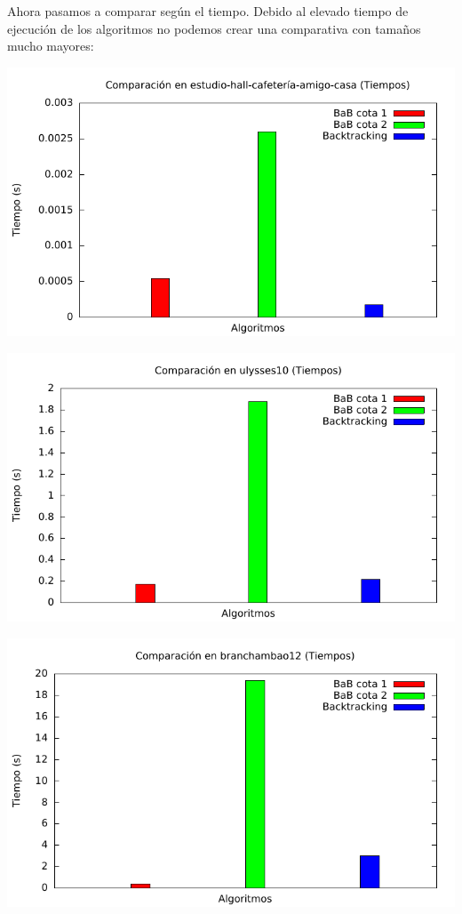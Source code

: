 Ahora pasamos a comparar según el tiempo. Debido al elevado tiempo de ejecución de los algoritmos no podemos crear una comparativa con tamaños mucho mayores:

\includegraphics[width=15cm]{img/barras_e-h-c-a-c5_t}

\includegraphics[width=15cm]{img/barras_ulysses10_t}

\includegraphics[width=15cm]{img/barras_branchambao12_t}

